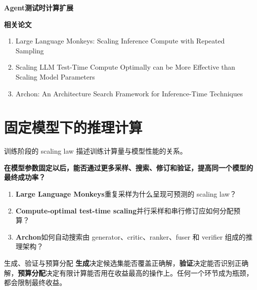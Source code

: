 \documentclass[a4paper]{article}
\begin{document}
\begin{titlepage}
\centering
\vspace*{0.18\textheight}
{\Huge\bfseries Agent测试时计算扩展\par}
\vspace{1.6cm}

\begin{minipage}{0.86\textwidth}
\raggedright
{\Large\bfseries 相关论文\par}
\vspace{0.6em}
\large
\begin{enumerate}
    \setlength{\itemsep}{0.8em}
    \item Large Language Monkeys: Scaling Inference Compute with Repeated Sampling
    \item Scaling LLM Test-Time Compute Optimally can be More Effective than Scaling Model Parameters
    \item Archon: An Architecture Search Framework for Inference-Time Techniques
\end{enumerate}
\end{minipage}
\end{titlepage}

\begingroup
\small
\tableofcontents
\endgroup
\newpage

\section{固定模型下的推理计算}

训练阶段的 scaling law 描述训练计算量与模型性能的关系。

\textbf{在模型参数固定以后，能否通过更多采样、搜索、修订和验证，提高同一个模型的最终成功率？}

\begin{enumerate}
    \item \textbf{Large Language Monkeys}\quad 重复采样为什么呈现可预测的 scaling law？
    \item \textbf{Compute-optimal test-time scaling}\quad 并行采样和串行修订应如何分配预算？
    \item \textbf{Archon}\quad 如何自动搜索由 generator、critic、ranker、fuser 和 verifier 组成的推理架构？
\end{enumerate}

\begin{importantbox}{生成、验证与预算分配}
\textbf{生成}决定候选集能否覆盖正确解，\textbf{验证}决定能否识别正确解，\textbf{预算分配}决定有限计算能否用在收益最高的操作上。任何一个环节成为瓶颈，都会限制最终收益。
\end{importantbox}
\end{document}
